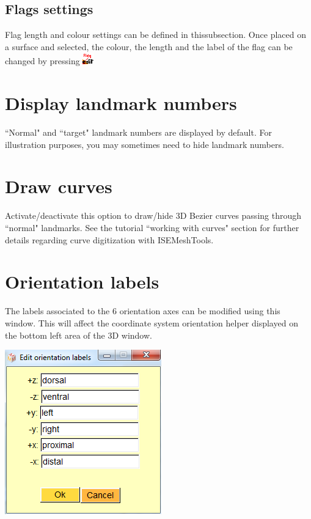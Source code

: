 \subsection{Flags settings}
Flag length and colour settings can be defined in thissubsection. Once placed on a surface and selected, the colour, the length and the label of the flag can be changed by pressing
\includegraphics[scale=0.7]{images/pixmap/Flag02.png}


\section{Display landmark numbers}
``Normal" and ``target" landmark numbers are displayed by default. For illustration purposes, you may sometimes need to hide landmark numbers.

\section{Draw curves}
Activate/deactivate this option to draw/hide 3D Bezier curves passing through ``normal" landmarks. See the tutorial ``working with curves" section for further details regarding curve digitization with ISEMeshTools.

\section{Orientation labels}


\noindent
\begin{minipage}{0.55\textwidth}
The labels associated to the 6 orientation axes can be modified using this window. This will affect the coordinate system orientation helper displayed on the bottom left area of the 3D
window.

\end{minipage}  
 \begin{minipage}{0.45\textwidth}\centering
\includegraphics[scale=0.5]{images/Viewing_options/Object_labels.png}

 \end{minipage} 
\noindent





